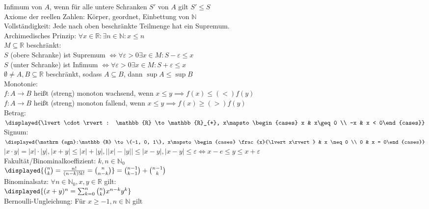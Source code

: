 \documentclass[9pt, landscape,a4paper]{extarticle}
\newcommand*\abs[1]{\lvert#1\rvert}
\newcommand\eps{\varepsilon}
\newcommand\sgn{\mathrm{sgn}}
\begin{document}
\begin{multicols*}{4}
  Infimum von $A$, wenn für alle untere Schranken $S'$ von $A$ gilt $S'\leq S$ \\
  Axiome der reellen Zahlen: Körper, geordnet, Einbettung von $\mathbb{N}$ \\
  Vollständigkeit: Jede nach oben beschränkte Teilmenge hat ein Supremum. \\
  Archimedisches Prinzip: $\forall x\in \mathbb{R}: \exists n\in \mathbb{N}: x\leq n$ \\
  $M\subseteq \mathbb{R}$ beschränkt: \\
  $S$ (obere Schranke) ist Supremum $\iff \forall \eps > 0 \exists x\in M: S - \eps \leq x$ \\
  $S$ (unter Schranke) ist Infimum $\iff \forall \eps > 0 \exists x\in M: S + \eps \leq x$ \\
  $\emptyset \neq A, B \subseteq \mathbb{R}$ beschränkt, sodass $A\subseteq B$, dann $\sup A \leq \sup B$ \\
  Monotonie: \\
  $f: A\to B$ heißt (streng) monoton wachsend, wenn $x\leq y \implies f(x) \leq (<) f(y)$ \\
  $f: A\to B$ heißt (streng) monoton fallend, wenn $x\leq y \implies f(x) \geq (>) f(y)$ \\
  Betrag: $\displayed{\abs{\cdot}: \mathbb{R} \to \mathbb{R}_{+}, x\mapsto \begin{cases} x & x\geq 0 \\ -x & x < 0\end{cases}}$ \\
  Signum: $\displayed{\sgn:\mathbb{R} \to \{-1, 0, 1\}, x\mapsto \begin{cases} \frac{x}{\abs{x}} & x \neq 0 \\ 0 & x = 0\end{cases}}$ \\
  $\abs{x \cdot y} = \abs{x}\cdot \abs{y}, \abs{x + y} \leq \abs{x} + \abs{y}, \abs{\abs{x} - \abs{y}} \leq \abs{x - y}, \abs{x - y} \leq \eps \iff x - e \leq y \leq x + \eps$ \\
  Fakultät/Binominalkoeffizient: $k, n\in \mathbb{N}_0$ \\
  $\displayed{\binom{n}{k} = \frac{n!}{(n - k)! k!} = \binom{n}{n - k}} = \binom{n - 1}{k - 1} + \binom{n - 1}{k}$ \\
  Binominalsatz: $\forall n\in\mathbb{N}_0, x, y\in\mathbb{R}$ gilt: \\
  $\displayed{(x + y)^n = \sum_{k = 0}^n\binom{n}{k} x^{n - k}y^k}$ \\
  Bernoulli-Ungleichung: Für $x\geq -1, n\in \mathbb{N}$ gilt \\

\end{multicols*}
\end{document}

